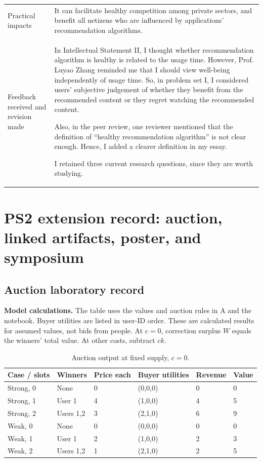 \begin{table}[H]
\begin{tabularx}{\textwidth}{@{}p{}Y@{}}
Practical impacts & It can facilitate healthy competition among private sectors, and benefit all netizens who are influenced by applications' recommendation algorithms. \\
Feedback received and revision made & In Intellectual Statement II, I thought whether recommendation algorithm is healthy is related to the usage time. However, Prof. Luyao Zhang reminded me that I should view well-being independently of usage time. So, in problem set I, I considered users' subjective judgement of whether they benefit from the recommended content or they regret watching the recommended content.\par Also, in the peer review, one reviewer mentioned that the definition of ``healthy recommendation algorithm'' is not clear enough. Hence, I added a clearer definition in my essay.\par I retained three current research questions, since they are worth studying.\\
\bottomrule\end{tabularx}\end{table}

\clearpage\twocolumn
\section{PS2 extension record: auction, linked artifacts, poster, and symposium}
\subsection{Auction laboratory record}
\textbf{Model calculations.} The table uses the values and auction rules in A and the notebook. Buyer utilities are listed in user-ID order. These are calculated results for assumed values, not bids from people. At $c=0$, correction surplus $W$ equals the winners' total value. At other costs, subtract $ck$.

\begin{table}[h]\centering
\caption{Auction output at fixed supply, $c=0$.}
\fontsize{9.1pt}{10.6pt}\selectfont\setlength{\tabcolsep}{2pt}
\begin{tabularx}{\columnwidth}{@{}YYYYYY@{}}\toprule
\textbf{Case / slots} & \textbf{Win\-ners} & \textbf{Price each} & \textbf{Buyer utilities} & \textbf{Reve\-nue} & \textbf{Value}\\\midrule
Strong, 0 & None & 0 & (0,0,0) & 0 & 0\\
Strong, 1 & User 1 & 4 & (1,0,0) & 4 & 5\\
Strong, 2 & Users 1,2 & 3 & (2,1,0) & 6 & 9\\
Weak, 0 & None & 0 & (0,0,0) & 0 & 0\\
Weak, 1 & User 1 & 2 & (1,0,0) & 2 & 3\\
Weak, 2 & Users 1,2 & 1 & (2,1,0) & 2 & 5\\
\bottomrule\end{tabularx}\end{table}

